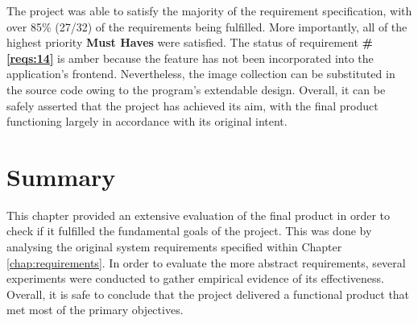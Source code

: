 \documentclass{l4proj}
\begin{document}
The project was able to satisfy the majority of the requirement specification, with over 85\% (27/32) of the requirements being fulfilled. More importantly, all of the highest priority \textbf{Must Haves} were satisfied. The status of requirement \textbf{\#\ref{reqs:14}} is amber because the feature has not been incorporated into the application's frontend. Nevertheless, the image collection can be substituted in the source code owing to the program's extendable design. Overall, it can be safely asserted that the project has achieved its aim, with the final product functioning largely in accordance with its original intent.


\section{Summary}
This chapter provided an extensive evaluation of the final product in order to check if it fulfilled the fundamental goals of the project. This was done by analysing the original system requirements specified within Chapter \ref{chap:requirements}. In order to evaluate the more abstract requirements, several experiments were conducted to gather empirical evidence of its effectiveness. Overall, it is safe to conclude that the project delivered a functional product that met most of the primary objectives. 



\end{document}
